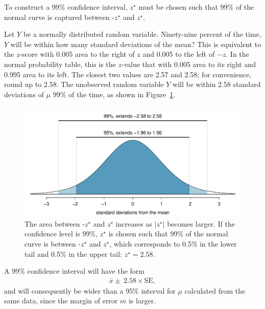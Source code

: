 To construct a 99\% confidence interval, $z^{\star}$ must be chosen such that 99\% of the normal curve is captured between -$z^{\star}$ and $z^{\star}$.

\begin{example}{Let $Y$ be a normally distributed random variable. Ninety-nine percent of the time, $Y$ will be within how many standard deviations of the mean?}
	This is equivalent to the $z$-score with 0.005 area to the right of $z$ and 0.005 to the left of $-z$. In the normal probability table, this is the $z$-value that with 0.005 area to its right and 0.995 area to its left. The closest two values are 2.57 and 2.58; for convenience, round up to 2.58. The unobserved random variable $Y$ will be within 2.58 standard deviations of $\mu$ 99\% of the time, as shown in Figure~\ref{choosingZForCI}.
\end{example}

\begin{figure}[h]
\begin{centering}
	\includegraphics[width=\textwidth]
	{ch_inference_foundations_oi_biostat/figures/choosingZForCI/choosingZForCI.pdf}
	\caption{The area between -$z^{\star}$ and $z^{\star}$ increases as $|z^{\star}|$ becomes larger. If the confidence level is 99\%, $z^{\star}$ is chosen such that 99\% of the normal curve is between -$z^{\star}$ and $z^{\star}$, which corresponds to 0.5\% in the lower tail and 0.5\% in the upper tail: $z^{\star}=2.58$.}
	\label{choosingZForCI}
  \end{centering}
\end{figure}
 
A 99\% confidence interval will have the form 
\begin{align}
	\overline{x} \pm \ 2.58 \times \text{SE},
\end{align}
 and will consequently be wider than a 95\% interval for $\mu$ calculated from the same data, since the margin of error $m$ is larger.


